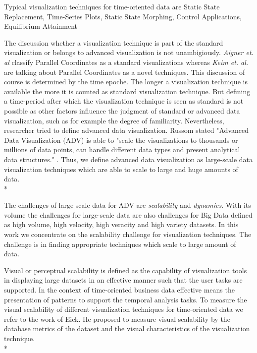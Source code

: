 
Typical visualization techniques for time-oriented data are 
Static State Replacement,
Time-Series Plots,
Static State Morphing,
Control Applications,
Equilibrium Attainment

 The discussion whether a visualization technique is part of the standard visualization or belongs to advanced visualization is not unambigiously. \textit{Aigner et. al} classify Parallel Coordinates as a standard visualizations\cite{Aigner2011} whereas \textit{Keim et. al.} \cite{Keim} are talking about Parallel Coordinates as a novel techniques. This discussion of course is determined by the time epoche. The longer a visualization technique is available the more it is counted as standard visualization technique. But defining a time-period after which the visualization technique is seen as standard is not possible as other factors influence the judgment of standard or advanced data visualization, such as for example the degree of familiarity. Nevertheless, researcher tried to define advanced data visualization. Russom stated "Advanced Data Visualization (ADV) is able to "scale the visualizations to thousands or millions of data points, can handle different data types and present analytical data structures." \cite{Russom2011}. Thus, we define advanced data visualization as large-scale data visualization techniques which are able to scale to large and huge amounts of data. 
 \\*


 The challenges of large-scale data for ADV are \textit{scalability} and \textit{dynamics}\cite{Wang2015}. With its volume the challenges for large-scale data are also challenges for Big Data defined as high volume, high velocity, high veracity and high variety datasets\cite{Wang2015}. In this work we concentrate on the scalability challenge for visualization techniques. The challenge is in finding appropriate techniques\cite{Aigner2008,Keim2005} which scale to large amount of data.
 \fi
 
Visual or perceptual scalability is defined as the capability of visualization tools in displaying large datasets in an effective manner\cite{Eick2002} such that the user tasks are supported. In the context of time-oriented business data effective means the presentation of patterns to support the temporal analysis tasks. To measure the visual scalability of different visualization techniques for time-oriented data we refer to the work of Eick\cite{Eick2002}. He proposed to measure visual scalability by the database metrics of the dataset and the visual characteristics of the visualization technique.\\*

